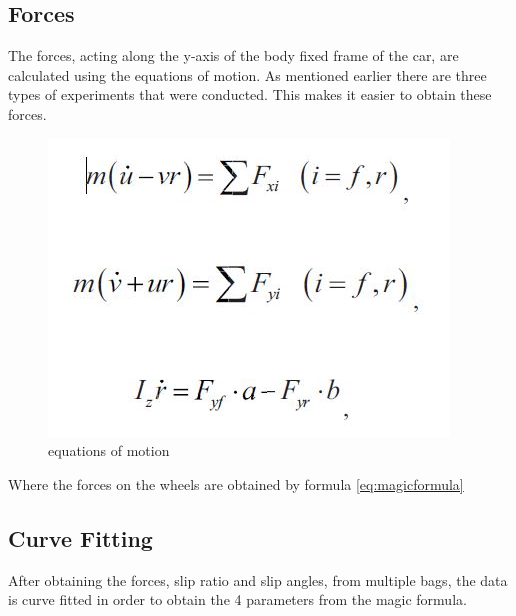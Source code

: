 \subsection{Forces}
The forces, acting along the y-axis of the body fixed frame of the car, are calculated using the equations of motion. As mentioned earlier there are three types of experiments that were conducted. This makes it easier to obtain these forces.

\begin{figure}
	\centering
	\includegraphics[scale=0.4]{figure/Equationsofmotion}
	\caption{equations of motion}
	\label{fig:brickwall}
	\end{figure}

Where the forces on the wheels are obtained by formula \ref{eq:magicformula}

\subsection{Curve Fitting}
After obtaining the forces, slip ratio and slip angles, from multiple bags, the data is curve fitted in order to obtain the 4 parameters from the magic formula.
 

